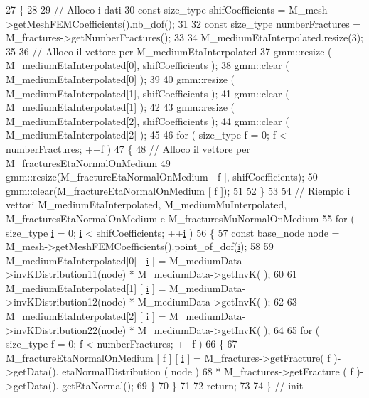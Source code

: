 \begin{DoxyCode}
27 \{
28 
29     \textcolor{comment}{// Alloco i dati}
30     \textcolor{keyword}{const} size\_type shifCoefficients = M\_mesh->getMeshFEMCoefficients().nb\_dof();
31 
32     \textcolor{keyword}{const} size\_type numberFractures = M\_fractures->getNumberFractures();
33 
34     M\_mediumEtaInterpolated.resize(3);
35 
36     \textcolor{comment}{// Alloco il vettore per M\_mediumEtaInterpolated}
37     gmm::resize ( M\_mediumEtaInterpolated[0], shifCoefficients );
38     gmm::clear ( M\_mediumEtaInterpolated[0] );
39 
40     gmm::resize ( M\_mediumEtaInterpolated[1], shifCoefficients );
41     gmm::clear ( M\_mediumEtaInterpolated[1] );
42 
43     gmm::resize ( M\_mediumEtaInterpolated[2], shifCoefficients );
44     gmm::clear ( M\_mediumEtaInterpolated[2] );
45 
46     \textcolor{keywordflow}{for} ( size\_type f = 0; f < numberFractures; ++f )
47     \{
48         \textcolor{comment}{// Alloco il vettore per M\_fracturesEtaNormalOnMedium}
49         gmm::resize(M\_fractureEtaNormalOnMedium [ f ], shifCoefficients);
50         gmm::clear(M\_fractureEtaNormalOnMedium [ f ]);
51 
52     \}
53 
54     \textcolor{comment}{// Riempio i vettori M\_mediumEtaInterpolated, M\_mediumMuInterpolated, M\_fracturesEtaNormalOnMedium e
       M\_fracturesMuNormalOnMedium }
55     \textcolor{keywordflow}{for} ( size\_type \hyperlink{matrici_8m_a6f6ccfcf58b31cb6412107d9d5281426}{i} = 0; \hyperlink{matrici_8m_a6f6ccfcf58b31cb6412107d9d5281426}{i} < shifCoefficients; ++\hyperlink{matrici_8m_a6f6ccfcf58b31cb6412107d9d5281426}{i} )
56     \{
57         \textcolor{keyword}{const} base\_node node = M\_mesh->getMeshFEMCoefficients().point\_of\_dof(\hyperlink{matrici_8m_a6f6ccfcf58b31cb6412107d9d5281426}{i});
58         
59         M\_mediumEtaInterpolated[0] [ \hyperlink{matrici_8m_a6f6ccfcf58b31cb6412107d9d5281426}{i} ] = M\_mediumData->invKDistribution11(node) * M\_mediumData->getInvK(
      );
60 
61         M\_mediumEtaInterpolated[1] [ \hyperlink{matrici_8m_a6f6ccfcf58b31cb6412107d9d5281426}{i} ] = M\_mediumData->invKDistribution12(node) * M\_mediumData->getInvK(
      );
62 
63         M\_mediumEtaInterpolated[2] [ \hyperlink{matrici_8m_a6f6ccfcf58b31cb6412107d9d5281426}{i} ] = M\_mediumData->invKDistribution22(node) * M\_mediumData->getInvK(
      );
64 
65         \textcolor{keywordflow}{for} ( size\_type f = 0; f < numberFractures; ++f )
66         \{
67             M\_fractureEtaNormalOnMedium [ f ] [ \hyperlink{matrici_8m_a6f6ccfcf58b31cb6412107d9d5281426}{i} ] = M\_fractures->getFracture( f )->getData().
      etaNormalDistribution ( node )
68                                                       * M\_fractures->getFracture ( f )->getData().
      getEtaNormal();
69         \}
70     \}
71     
72     \textcolor{keywordflow}{return};
73 
74 \} \textcolor{comment}{// init}
\end{DoxyCode}
